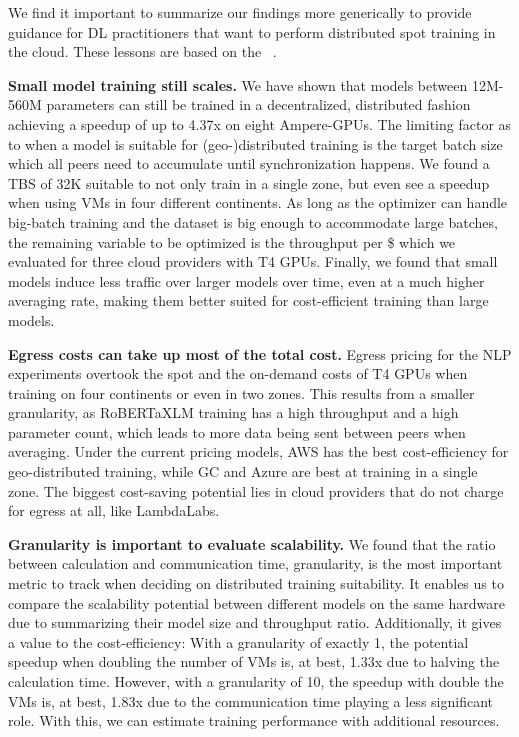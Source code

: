 We find it important to summarize our findings more generically to provide guidance for DL practitioners that want to perform distributed spot training in the cloud. These lessons are based on the ~.

\textbf{Small model training still scales.}
We have shown that models between 12M-560M parameters can still be trained in a decentralized, distributed fashion achieving a speedup of up to 4.37x on eight Ampere-GPUs.
The limiting factor as to when a model is suitable for (geo-)distributed training is the target batch size which all peers need to accumulate until synchronization happens.
We found a TBS of 32K suitable to not only train in a single zone, but even see a speedup when using VMs in four different continents.
As long as the optimizer can handle big-batch training and the dataset is big enough to accommodate large batches, the remaining variable to be optimized is the throughput per \$ which we evaluated for three cloud providers with T4 GPUs.
Finally, we found that small models induce less traffic over larger models over time, even at a much higher averaging rate, making them better suited for cost-efficient training than large models.

\textbf{Egress costs can take up most of the total cost.}
Egress pricing for the NLP experiments overtook the spot and the on-demand costs of T4 GPUs when training on four continents or even in two zones.
This results from a smaller granularity, as RoBERTaXLM training has a high throughput and a high parameter count, which leads to more data being sent between peers when averaging.
Under the current pricing models, AWS has the best cost-efficiency for geo-distributed training, while GC and Azure are best at training in a single zone.
The biggest cost-saving potential lies in cloud providers that do not charge for egress at all, like LambdaLabs.



\textbf{Granularity is important to evaluate scalability.}
We found that the ratio between calculation and communication time, granularity, is the most important metric to track when deciding on distributed training suitability.
It enables us to compare the scalability potential between different models on the same hardware due to summarizing their model size and throughput ratio.
Additionally, it gives a value to the cost-efficiency: With a granularity of exactly 1, the potential speedup when doubling the number of VMs is, at best, 1.33x due to halving the calculation time.
However, with a granularity of 10, the speedup with double the VMs is, at best, 1.83x due to the communication time playing a less significant role.
With this, we can estimate training performance with additional resources.

